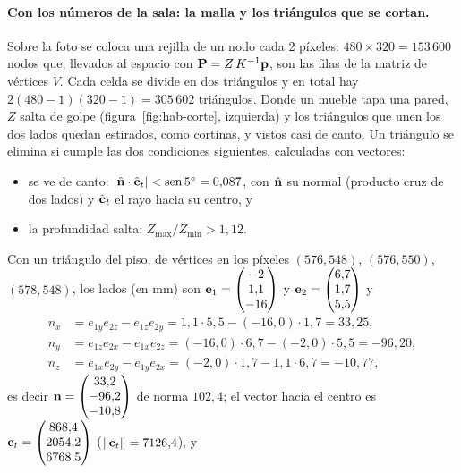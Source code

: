 \paragraph{Con los números de la sala: la malla y los triángulos que se cortan.} Sobre la foto se coloca una rejilla de un nodo cada 2 píxeles: $480\times320=153\,600$ nodos que,
llevados al espacio con $\mathbf{P}=Z\,K^{-1}\mathbf{p}$, son las filas de la matriz de vértices $V$. Cada celda se divide en dos triángulos y en total hay
$2(480-1)(320-1)=305\,602$ triángulos. Donde un mueble tapa una pared, $Z$ salta de golpe (figura~\ref{fig:hab-corte}, izquierda) y los triángulos que unen los dos lados
quedan estirados, como cortinas, y vistos casi de canto. Un triángulo se elimina si cumple las dos condiciones siguientes, calculadas con vectores:
\begin{itemize}
  \item se ve de canto: $\lvert\hat{\mathbf{n}}\cdot\hat{\mathbf{c}}_t\rvert<\operatorname{sen}5^\circ=0{,}087$, con $\hat{\mathbf{n}}$ su normal (producto cruz de dos lados) y $\hat{\mathbf{c}}_t$ el
        rayo hacia su centro, y
  \item la profundidad salta: $Z_{\max}/Z_{\min}>1{,}12$.
\end{itemize}
Con un triángulo del piso, de vértices en los píxeles $(576,548)$, $(576,550)$, $(578,548)$, los lados (en mm) son $\mathbf{e}_1=\begin{pmatrix} -2 \\ 1{,}1 \\ -16 \end{pmatrix}$ y $\mathbf{e}_2=\begin{pmatrix} 6{,}7 \\ 1{,}7 \\ 5{,}5 \end{pmatrix}$ y
\begin{align*}
n_x&=e_{1y}e_{2z}-e_{1z}e_{2y}=1{,}1\cdot5{,}5-\left(-16{,}0\right)\cdot1{,}7=33{,}25,\\
n_y&=e_{1z}e_{2x}-e_{1x}e_{2z}=\left(-16{,}0\right)\cdot6{,}7-\left(-2{,}0\right)\cdot5{,}5=-96{,}20,\\
n_z&=e_{1x}e_{2y}-e_{1y}e_{2x}=\left(-2{,}0\right)\cdot1{,}7-1{,}1\cdot6{,}7=-10{,}77,
\end{align*}
es decir $\mathbf{n}=\begin{pmatrix} 33{,}2 \\ -96{,}2 \\ -10{,}8 \end{pmatrix}$ de norma $102{,}4$; el vector hacia el centro es $\mathbf{c}_t=\begin{pmatrix} 868{,}4 \\ 2054{,}2 \\ 6768{,}5 \end{pmatrix}$ ($\lVert\mathbf{c}_t\rVert=7126{,}4$), y
